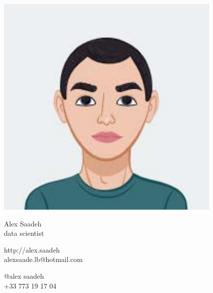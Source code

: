 \documentclass{article}
\begin{document}
\centering \includegraphics[width=.25\linewidth]{logo}\\[5pt]
\parbox{2in}{\Large \centering Alex Saadeh\\[1pt]
\normalsize data scientist}

\vfill
\raggedright
\begin{multicols}{2}
http://alex.saadeh\\
alexsaade.lb@hotmail.com

\columnbreak
\raggedleft
@alex saadeh\\
+33 773 19 17 04\\

\end{multicols}%
\end{document}
